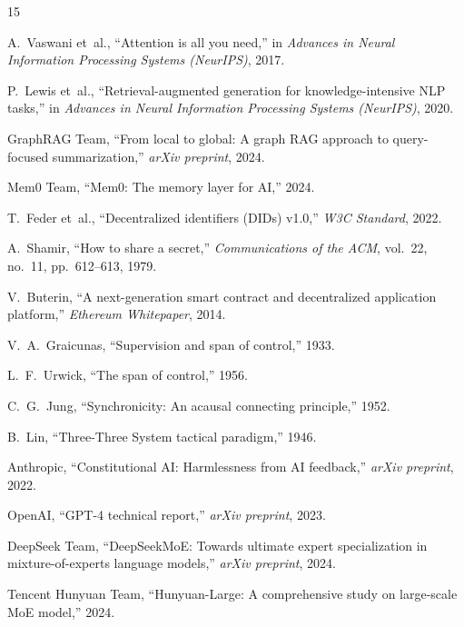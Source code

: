 \documentclass[11pt,a4paper]{article}
\begin{document}
\begin{thebibliography}{15}

A.~Vaswani et~al., ``Attention is all you need,'' in \emph{Advances in Neural Information Processing Systems (NeurIPS)}, 2017.

P.~Lewis et~al., ``Retrieval-augmented generation for knowledge-intensive NLP tasks,'' in \emph{Advances in Neural Information Processing Systems (NeurIPS)}, 2020.

GraphRAG Team, ``From local to global: A graph RAG approach to query-focused summarization,'' \emph{arXiv preprint}, 2024.

Mem0 Team, ``Mem0: The memory layer for AI,'' 2024.

T.~Feder et~al., ``Decentralized identifiers (DIDs) v1.0,'' \emph{W3C Standard}, 2022.

A.~Shamir, ``How to share a secret,'' \emph{Communications of the ACM}, vol.~22, no.~11, pp.~612--613, 1979.

V.~Buterin, ``A next-generation smart contract and decentralized application platform,'' \emph{Ethereum Whitepaper}, 2014.

V.~A.~Graicunas, ``Supervision and span of control,'' 1933.

L.~F.~Urwick, ``The span of control,'' 1956.

C.~G.~Jung, ``Synchronicity: An acausal connecting principle,'' 1952.

B.~Lin, ``Three-Three System tactical paradigm,'' 1946.

Anthropic, ``Constitutional AI: Harmlessness from AI feedback,'' \emph{arXiv preprint}, 2022.

OpenAI, ``GPT-4 technical report,'' \emph{arXiv preprint}, 2023.

DeepSeek Team, ``DeepSeekMoE: Towards ultimate expert specialization in mixture-of-experts language models,'' \emph{arXiv preprint}, 2024.

Tencent Hunyuan Team, ``Hunyuan-Large: A comprehensive study on large-scale MoE model,'' 2024.

\end{thebibliography}

\end{document}
